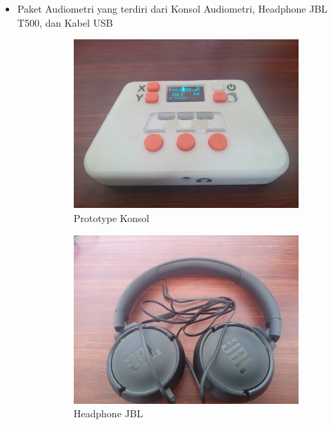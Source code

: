 \documentclass{article}
\begin{document}
\begin{itemize}
		\item Paket Audiometri yang terdiri dari Konsol Audiometri, Headphone JBL T500, dan Kabel USB

		\begin{figure}[H]
			\centering
			\begin{subfigure}[]{.35\textwidth}
				\includegraphics[width=\textwidth]{images/proto}
				\caption{Prototype Konsol}
			\end{subfigure}
			\begin{subfigure}[]{.25\textwidth}
				\includegraphics[width=\textwidth]{images/jbl}
				\caption{Headphone JBL}
			\end{subfigure}
			\\
			\begin{subfigure}[]{.25\textwidth}

\end{subfigure}
\end{figure}
\end{itemize}
\end{document}
